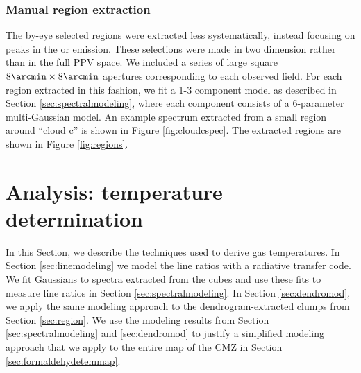 \subsubsection{Manual region extraction}
\label{sec:byeye}
The by-eye selected regions were extracted less systematically, instead
focusing on peaks in the \threeohthree or \threetwoone emission.  These
selections were made in two dimension rather than in the full PPV space.  We
included a series of large square $8\arcmin \times 8\arcmin$ apertures
corresponding to each observed field.  For each region extracted in this
fashion, we fit a 1-3 component model as described in Section
\ref{sec:spectralmodeling}, where each component consists of a 6-parameter
multi-Gaussian model.  An example spectrum extracted from a small region around
``cloud c'' is shown in Figure \ref{fig:cloudcspec}.  The extracted regions are
shown in Figure \ref{fig:regions}.

\section{Analysis: temperature determination}
\label{sec:analysis}
In this Section, we describe the techniques used to derive gas temperatures.
In Section \ref{sec:linemodeling} we model the line ratios with a radiative
transfer code.  We fit Gaussians to spectra extracted from the cubes and use
these fits to measure line ratios in Section \ref{sec:spectralmodeling}.  In
Section \ref{sec:dendromod}, we apply the same modeling approach to the
dendrogram-extracted clumps from Section \ref{sec:region}.  We use the modeling
results from Section \ref{sec:spectralmodeling} and \ref{sec:dendromod} to
justify a simplified modeling approach that we apply to the entire map of the
CMZ in Section \ref{sec:formaldehydetemmap}.


